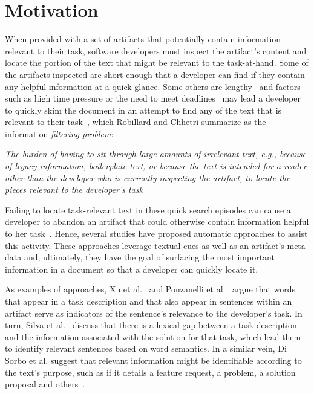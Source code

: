 \section{Motivation}
\label{cp5:motivation}

When provided with a set of artifacts that potentially contain information relevant to their task,
software developers must inspect the artifact's content and locate the portion of the text that might be relevant to the task-at-hand. 
Some of the artifacts inspected are short enough that a developer can find if they contain any helpful information at a quick glance.
Some others are lengthy~\cite{Rastkar2013t} and factors such
as high time pressure or
the need to meet deadlines~\cite{meyer2019}
may lead a developer to quickly skim the document
in an attempt to find any of the text that is relevant to their task~\cite{Starke2009},
which Robillard and Chhetri summarize as the information \textit{filtering problem}:

\smallskip
\begin{bluequote}
    \textit{The burden  of having to sit through large amounts of irrelevant text, e.g., because of legacy information, boilerplate text, or because the text is intended for a reader other than the developer who is currently inspecting the artifact, to locate the pieces relevant to the developer's task}~\cite{Robillard2015}
\end{bluequote}



Failing to locate task-relevant text in these quick search episodes can 
cause a developer to abandon an artifact that could otherwise contain information  helpful to her task~\cite{Brandt2009a, Starke2009}.
Hence, several studies have proposed automatic approaches to assist this activity. 
These approaches leverage textual cues as well as an artifact's meta-data and, ultimately, they have the goal of surfacing 
the most important information in a document so that a developer can quickly 
locate it.


As examples of approaches, Xu et al.~\cite{Xu2017} and Ponzanelli et al.~\cite{Ponzanelli2015}
argue that words that appear in a task description and that also appear in sentences within an artifact serve as indicators of the sentence's relevance to the developer's task.
In turn, Silva et al.~\cite{silva2019} discuss that 
there is a lexical gap between a task description and the information associated 
with the solution for that task, which lead them to identify
relevant sentences based on word semantics.
In a similar vein, Di Sorbo et al. suggest that relevant information might be identifiable 
according to the text's purpose, such as if it details a feature request, a problem, a solution proposal and others~\cite{Sorbo2015}.


